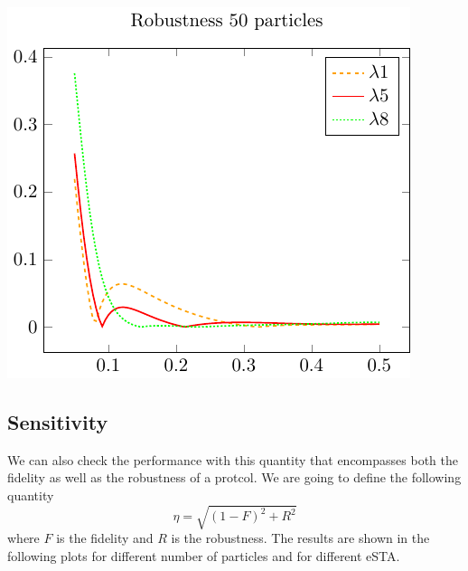\documentclass{article}
\begin{document}
\begin{center}
	\includegraphics{./gfx/robustness_compare50.pdf}
\end{center}

\subsection{Sensitivity}
We can also check the performance with this quantity that encompasses both the fidelity as well as the robustness of a protcol.
We are going to define the following quantity
\begin{equation}
	\eta = \sqrt{(1-F)^{2} + R^{2}}
	\label{eq:Sensitivity}
\end{equation}
where $F$ is the fidelity and $ R $  is the robustness.
The results are shown in the following plots for different number of particles and for different eSTA.
\end{document}
